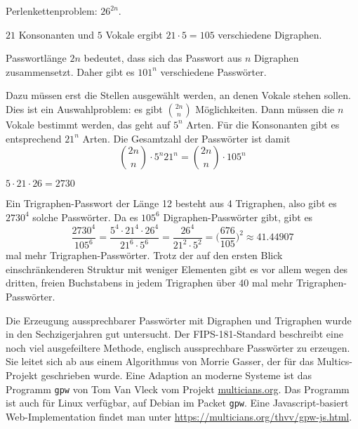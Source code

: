 \begin{loesung}
\begin{teilaufgaben}
\item
Perlenkettenproblem: $26^{2n}$.
\item
$21$ Konsonanten und $5$ Vokale ergibt $21\cdot 5=105$ verschiedene 
Digraphen.
\item
Passwortlänge $2n$ bedeutet, dass sich das Passwort aus $n$ Digraphen
zusammensetzt.
Daher gibt es $101^n$ verschiedene Passwörter.
\item
Dazu müssen erst die Stellen ausgewählt werden, an denen Vokale stehen
sollen.
Dies ist ein Auswahlproblem: es gibt $\binom{2n}{n}$ Möglichkeiten.
Dann müssen die $n$ Vokale bestimmt werden, das geht auf $5^n$ Arten.
Für die Konsonanten gibt es entsprechend $21^n$ Arten.
Die Gesamtzahl der Passwörter ist damit
\[
\binom{2n}{n}\cdot 5^n 21^n 
=
\binom{2n}{n} \cdot 105^n
\]
\item
$5\cdot 21\cdot 26=2730$
\item
Ein Trigraphen-Passwort der Länge 12 besteht aus 4 Trigraphen, also
gibt es $2730^4$ solche Passwörter.
Da es $105^6$ Digraphen-Passwörter gibt, gibt es
\[
\frac{2730^4}{105^6}
=
\frac{5^4\cdot 21^4\cdot 26^4}{21^6\cdot 5^6}
=
\frac{26^4}{21^2\cdot 5^2}
=
\biggl(
\frac{676}{105}
\biggr)^2
\approx
41.44907
\]
mal mehr Trigraphen-Passwörter.
Trotz der auf den ersten Blick einschränkenderen Struktur mit
weniger Elementen gibt es vor allem wegen des dritten, freien Buchstabens
in jedem Trigraphen über 40 mal mehr Trigraphen-Passwörter.
\qedhere
\end{teilaufgaben}
\end{loesung}

\begin{diskussion}
Die Erzeugung aussprechbarer Passwörter mit Digraphen und Trigraphen
wurde in den Sechzigerjahren gut untersucht.
Der FIPS-181-Standard beschreibt eine noch viel ausgefeiltere Methode,
englisch aussprechbare Passwörter zu erzeugen.
Sie leitet sich ab aus einem Algorithmus von Morrie Gasser, der für
das Multics-Projekt geschrieben wurde.
Eine Adaption an moderne Systeme ist das Programm \texttt{gpw} von
Tom Van Vleck vom Projekt \url{multicians.org}.
Das Programm ist auch für Linux verfügbar, auf Debian im Packet 
\texttt{gpw}.
Eine Javascript-basiert Web-Implementation findet man unter
\url{https://multicians.org/thvv/gpw-js.html}.
\end{diskussion}
